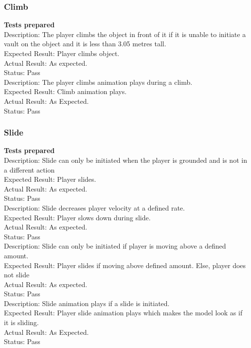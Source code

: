 \documentclass[11pt,a4paper]{article}
\begin{document}
\subsubsection{Climb}
\textbf{Tests prepared}\\
Description: The player climbs the object in front of it if it is unable to initiate a vault on the object and it is less than 3.05 metres tall. \\
Expected Result: Player climbs object.\\
Actual Result: As expected.\\
Status: Pass
\smallskip\\
Description: The player climbs animation plays during a climb. \\
Expected Result: Climb animation plays.\\
Actual Result:  As Expected.\\
Status: Pass
\subsubsection{Slide}
\textbf{Tests prepared}\\
Description: Slide can only be initiated when the player is grounded and is not in a different action\\
Expected Result: Player slides.\\
Actual Result: As expected.\\
Status: Pass
\smallskip\\
Description: Slide decreases player velocity at a defined rate. \\
Expected Result: Player slows down during slide.\\
Actual Result: As expected.\\
Status: Pass
\smallskip\\
Description: Slide can only be initiated if player is moving above a defined amount. \\
Expected Result: Player slides if moving above defined amount. Else, player does not slide\\
Actual Result: As expected.\\
Status: Pass
\smallskip\\
Description: Slide animation plays if a slide is initiated. \\
Expected Result: Player slide animation plays which makes the model look as if it is sliding.\\
Actual Result: As Expected.\\
Status: Pass
\end{document}
